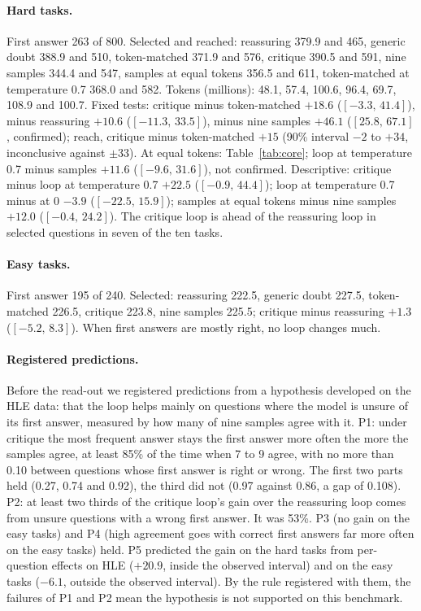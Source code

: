 \documentclass[11pt]{article}
\newcommand{\ci}[2]{$[#1,\,#2]$}
\begin{document}
\paragraph{Hard tasks.}
First answer 263 of 800.
Selected and reached: reassuring 379.9 and 465, generic doubt 388.9 and 510, token-matched 371.9 and 576, critique 390.5 and 591, nine samples 344.4 and 547, samples at equal tokens 356.5 and 611, token-matched at temperature 0.7 368.0 and 582.
Tokens (millions): 48.1, 57.4, 100.6, 96.4, 69.7, 108.9 and 100.7.
Fixed tests: critique minus token-matched $+18.6$ (\ci{-3.3}{41.4}), minus reassuring $+10.6$ (\ci{-11.3}{33.5}), minus nine samples $+46.1$ (\ci{25.8}{67.1}, confirmed); reach, critique minus token-matched $+15$ (90\% interval $-2$ to $+34$, inconclusive against $\pm33$).
At equal tokens: Table~\ref{tab:core}; loop at temperature 0.7 minus samples $+11.6$ (\ci{-9.6}{31.6}), not confirmed.
Descriptive: critique minus loop at temperature 0.7 $+22.5$ (\ci{-0.9}{44.4}); loop at temperature 0.7 minus at 0 $-3.9$ (\ci{-22.5}{15.9}); samples at equal tokens minus nine samples $+12.0$ (\ci{-0.4}{24.2}).
The critique loop is ahead of the reassuring loop in selected questions in seven of the ten tasks.

\paragraph{Easy tasks.}
First answer 195 of 240.
Selected: reassuring 222.5, generic doubt 227.5, token-matched 226.5, critique 223.8, nine samples 225.5; critique minus reassuring $+1.3$ (\ci{-5.2}{8.3}).
When first answers are mostly right, no loop changes much.

\paragraph{Registered predictions.}
Before the read-out we registered predictions from a hypothesis developed on the HLE data: that the loop helps mainly on questions where the model is unsure of its first answer, measured by how many of nine samples agree with it.
P1: under critique the most frequent answer stays the first answer more often the more the samples agree, at least 85\% of the time when 7 to 9 agree, with no more than 0.10 between questions whose first answer is right or wrong.
The first two parts held (0.27, 0.74 and 0.92), the third did not (0.97 against 0.86, a gap of 0.108).
P2: at least two thirds of the critique loop's gain over the reassuring loop comes from unsure questions with a wrong first answer. It was 53\%.
P3 (no gain on the easy tasks) and P4 (high agreement goes with correct first answers far more often on the easy tasks) held.
P5 predicted the gain on the hard tasks from per-question effects on HLE ($+20.9$, inside the observed interval) and on the easy tasks ($-6.1$, outside the observed interval).
By the rule registered with them, the failures of P1 and P2 mean the hypothesis is not supported on this benchmark.
\end{document}
